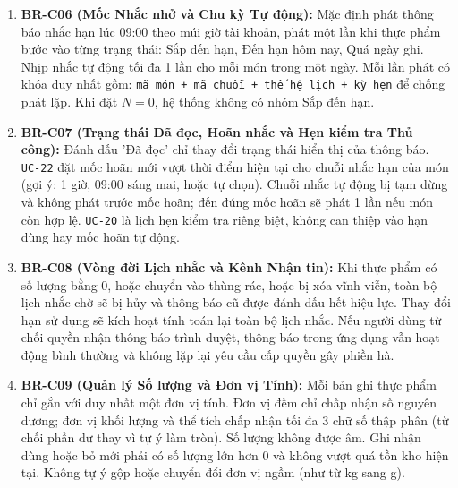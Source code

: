 \documentclass[10pt,a4paper]{article}
\begin{document}
\begin{enumerate}[leftmargin=2em,itemsep=6pt]
\begin{itemize}
        \item Còn từ $1 \dots N$ ngày: \textbf{Sắp đến hạn} (ngưỡng $N$ mặc định là 3 ngày, tùy chỉnh từ $0 \dots 30$ ngày);
        \item HSD xa hơn $N$ ngày: \textbf{Chưa đến ngưỡng cảnh báo};
        \item Thiếu HSD hoặc ngày chưa rõ ràng: \textbf{Chưa rõ hạn}.
    \end{itemize}
    Chỉ những món đang hoạt động và còn số lượng lớn hơn 0 mới được đưa vào danh sách cần xử lý. Thứ tự ưu tiên hiển thị: Quá ngày ghi $\to$ Đến hạn hôm nay $\to$ Sắp đến hạn (sắp xếp tăng dần theo hạn sử dụng). Món chưa rõ hạn được gom vào nhóm hiển thị riêng.
    \item \textbf{BR-C06 (Mốc Nhắc nhở và Chu kỳ Tự động):} Mặc định phát thông báo nhắc hạn lúc 09:00 theo múi giờ tài khoản, phát một lần khi thực phẩm bước vào từng trạng thái: Sắp đến hạn, Đến hạn hôm nay, Quá ngày ghi. Nhịp nhắc tự động tối đa 1 lần cho mỗi món trong một ngày. Mỗi lần phát có khóa duy nhất gồm: \texttt{mã món + mã chuỗi + thế hệ lịch + kỳ hẹn} để chống phát lặp. Khi đặt $N=0$, hệ thống không có nhóm Sắp đến hạn.
    \item \textbf{BR-C07 (Trạng thái Đã đọc, Hoãn nhắc và Hẹn kiểm tra Thủ công):} Đánh dấu 'Đã đọc' chỉ thay đổi trạng thái hiển thị của thông báo. \texttt{UC-22} đặt mốc hoãn mới vượt thời điểm hiện tại cho chuỗi nhắc hạn của món (gợi ý: 1 giờ, 09:00 sáng mai, hoặc tự chọn). Chuỗi nhắc tự động bị tạm dừng và không phát trước mốc hoãn; đến đúng mốc hoãn sẽ phát 1 lần nếu món còn hợp lệ. \texttt{UC-20} là lịch hẹn kiểm tra riêng biệt, không can thiệp vào hạn dùng hay mốc hoãn tự động.
    \item \textbf{BR-C08 (Vòng đời Lịch nhắc và Kênh Nhận tin):} Khi thực phẩm có số lượng bằng 0, hoặc chuyển vào thùng rác, hoặc bị xóa vĩnh viễn, toàn bộ lịch nhắc chờ sẽ bị hủy và thông báo cũ được đánh dấu hết hiệu lực. Thay đổi hạn sử dụng sẽ kích hoạt tính toán lại toàn bộ lịch nhắc. Nếu người dùng từ chối quyền nhận thông báo trình duyệt, thông báo trong ứng dụng vẫn hoạt động bình thường và không lặp lại yêu cầu cấp quyền gây phiền hà.
    \item \textbf{BR-C09 (Quản lý Số lượng và Đơn vị Tính):} Mỗi bản ghi thực phẩm chỉ gắn với duy nhất một đơn vị tính. Đơn vị đếm chỉ chấp nhận số nguyên dương; đơn vị khối lượng và thể tích chấp nhận tối đa 3 chữ số thập phân (từ chối phần dư thay vì tự ý làm tròn). Số lượng không được âm. Ghi nhận dùng hoặc bỏ mới phải có số lượng lớn hơn 0 và không vượt quá tồn kho hiện tại. Không tự ý gộp hoặc chuyển đổi đơn vị ngầm (như từ kg sang g).

\end{enumerate}
\end{document}
